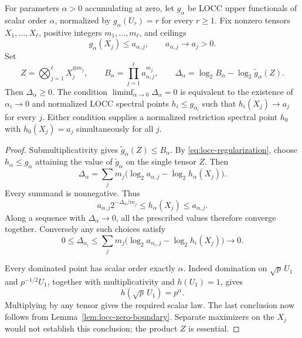 \begin{proposition}
\label{prop:joint-locc-deficit}
For parameters $\alpha>0$ accumulating at zero, let $g_\alpha$ be LOCC
upper functionals of scalar order $\alpha$, normalized by
$g_\alpha(U_r)=r$ for every $r\geq1$. Fix nonzero tensors
$X_1,\ldots,X_\ell$, positive integers $m_1,\ldots,m_\ell$, and ceilings
\[
 g_\alpha(X_j)\leq a_{\alpha,j},\qquad
 a_{\alpha,j}\longrightarrow a_j>0.
\]
Set
\[
 Z=\bigotimes_{j=1}^{\ell}X_j^{\otimes m_j},\qquad
 B_\alpha=\prod_{j=1}^{\ell}a_{\alpha,j}^{m_j},\qquad
 \Delta_\alpha=\log_2B_\alpha-
                   \log_2\widetilde g_\alpha(Z).
\]
Then $\Delta_\alpha\geq0$. The condition
$\liminf_{\alpha\to0}\Delta_\alpha=0$ is equivalent to the existence of
$\alpha_i\to0$ and normalized LOCC spectral points
$h_i\leq g_{\alpha_i}$ such that $h_i(X_j)\to a_j$ for every $j$.
Either condition supplies a normalized restriction spectral point
$h_0$ with $h_0(X_j)=a_j$ simultaneously for all $j$.
\end{proposition}
\begin{proof}
Submultiplicativity gives $\widetilde g_\alpha(Z)\leq B_\alpha$.
By \eqref{eq:locc-regularization}, choose $h_\alpha\leq g_\alpha$ attaining
the value of $\widetilde g_\alpha$ on the single tensor $Z$. Then
\[
 \Delta_\alpha
 =\sum_jm_j\bigl(\log_2a_{\alpha,j}-\log_2h_\alpha(X_j)\bigr).
\]
Every summand is nonnegative. Thus
\[
 a_{\alpha,j}2^{-\Delta_\alpha/m_j}
 \leq h_\alpha(X_j)\leq a_{\alpha,j}.
\]
Along a sequence with $\Delta_\alpha\to0$, all the prescribed values
therefore converge together. Conversely any such choices satisfy
\[
 0\leq\Delta_{\alpha_i}
 \leq\sum_jm_j
       \bigl(\log_2a_{\alpha_i,j}-\log_2h_i(X_j)\bigr)
 \longrightarrow0.
\]

Every dominated point has scalar order exactly $\alpha$. Indeed domination
on $\sqrt p\,U_1$ and $p^{-1/2}U_1$, together with multiplicativity and
$h(U_1)=1$, gives
\[
 h(\sqrt p\,U_1)=p^\alpha.
\]
Multiplying by any tensor gives the required scalar law. The last conclusion
now follows from Lemma~\ref{lem:locc-zero-boundary}. Separate maximizers on
the $X_j$ would not establish this conclusion; the product $Z$ is essential.
\end{proof}

